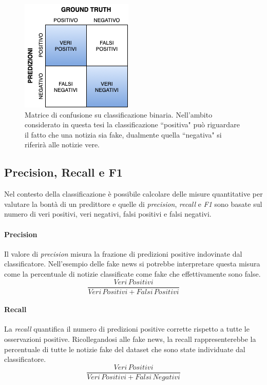 \documentclass[12pt]{report}
\theoremstyle{definition}
\begin{document}
\begin{figure}
    \centering
    \includegraphics[scale=0.7]{images/confusion matrix.png}
    \caption{Matrice di confusione su classificazione binaria. Nell'ambito considerato in questa tesi la classificazione ``positiva" può riguardare il fatto che una notizia sia fake, dualmente quella ``negativa" si riferirà alle notizie vere.}
    \label{confusion}
\end{figure}

\subsection{Precision, Recall e F1}\label{erroreclass}
Nel contesto della classificazione è possibile calcolare delle misure quantitative per valutare la bontà di un predittore e quelle di \textit{precision}, \textit{recall} e \textit{F1} sono basate sul numero di veri positivi, veri negativi, falsi positivi e falsi negativi.

\paragraph{Precision}
Il valore di \textit{precision} misura la frazione di predizioni positive indovinate dal classificatore. Nell'esempio delle fake news si potrebbe interpretare questa misura come la percentuale di notizie classificate come fake che effettivamente sono false.
\begin{equation}
\frac{Veri\,Positivi}{Veri\,Positivi + Falsi\,Positivi}
\end{equation}

\paragraph{Recall}
La \textit{recall} quantifica il numero di predizioni positive corrette rispetto a tutte le osservazioni positive. Ricollegandosi alle fake news, la recall rappresenterebbe la percentuale di tutte le notizie fake del dataset che sono state individuate dal classificatore.
\begin{equation}
\frac{Veri\,Positivi}{Veri\,Positivi + Falsi\,Negativi}
\end{equation}
\end{document}
